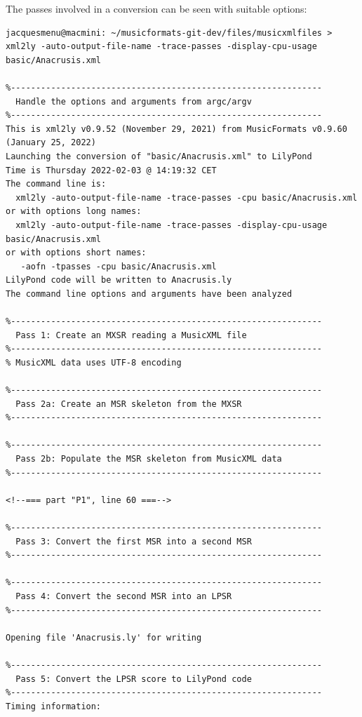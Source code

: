 The passes involved in a conversion can be seen with suitable %
options:
\begin{lstlisting}[language=Terminal]
jacquesmenu@macmini: ~/musicformats-git-dev/files/musicxmlfiles > xml2ly -auto-output-file-name -trace-passes -display-cpu-usage basic/Anacrusis.xml

%--------------------------------------------------------------
  Handle the options and arguments from argc/argv
%--------------------------------------------------------------
This is xml2ly v0.9.52 (November 29, 2021) from MusicFormats v0.9.60 (January 25, 2022)
Launching the conversion of "basic/Anacrusis.xml" to LilyPond
Time is Thursday 2022-02-03 @ 14:19:32 CET
The command line is:
  xml2ly -auto-output-file-name -trace-passes -cpu basic/Anacrusis.xml
or with options long names:
  xml2ly -auto-output-file-name -trace-passes -display-cpu-usage basic/Anacrusis.xml
or with options short names:
   -aofn -tpasses -cpu basic/Anacrusis.xml
LilyPond code will be written to Anacrusis.ly
The command line options and arguments have been analyzed

%--------------------------------------------------------------
  Pass 1: Create an MXSR reading a MusicXML file
%--------------------------------------------------------------
% MusicXML data uses UTF-8 encoding

%--------------------------------------------------------------
  Pass 2a: Create an MSR skeleton from the MXSR
%--------------------------------------------------------------

%--------------------------------------------------------------
  Pass 2b: Populate the MSR skeleton from MusicXML data
%--------------------------------------------------------------

<!--=== part "P1", line 60 ===-->

%--------------------------------------------------------------
  Pass 3: Convert the first MSR into a second MSR
%--------------------------------------------------------------

%--------------------------------------------------------------
  Pass 4: Convert the second MSR into an LPSR
%--------------------------------------------------------------

Opening file 'Anacrusis.ly' for writing

%--------------------------------------------------------------
  Pass 5: Convert the LPSR score to LilyPond code
%--------------------------------------------------------------
Timing information:


\end{lstlisting}
